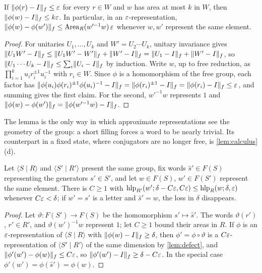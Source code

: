\begin{lemma}\label{lem:defect}
If $\lVert \phi(r)-I\rVert_f\le\varepsilon$ for every $r\in W$ and $w$ has area at most $k$ in $W$, then $\lVert \phi(w)-I\rVert_f\le k\varepsilon$. In particular, in an
$\varepsilon$-representation, $\lVert \phi(w)-\phi(w')\rVert_f\le\operatorname{Area}_R(w'^{-1}w)\,\varepsilon$ whenever $w,w'$ represent the same element.
\end{lemma}

\begin{proof}
For unitaries $U_1,\dots,U_k$ and $W'=U_2\cdots U_k$, unitary invariance gives $\lVert U_1W'-I\rVert_f\le\lVert U_1W'-W'\rVert_f+\lVert W'-I\rVert_f=\lVert U_1-I\rVert_f+\lVert W'-I\rVert_f$,
so $\lVert U_1\cdots U_k-I\rVert_f\le\sum_i\lVert U_i-I\rVert_f$ by induction. Write $w$, up to free reduction, as $\prod_{i=1}^ku_ir_i^{\pm1}u_i^{-1}$ with
$r_i\in W$. Since $\phi$ is a homomorphism of the free group, each factor has
$\lVert \phi(u_i)\phi(r_i)^{\pm1}\phi(u_i)^{-1}-I\rVert_f=\lVert \phi(r_i)^{\pm1}-I\rVert_f=\lVert \phi(r_i)-I\rVert_f\le\varepsilon$, and summing gives the first claim. For the
second, $w'^{-1}w$ represents $1$ and $\lVert \phi(w)-\phi(w')\rVert_f=\lVert \phi(w'^{-1}w)-I\rVert_f$.
\end{proof}

The lemma is the only way in which approximate representations see the geometry of the group: a short filling forces a word to be nearly
trivial. Its counterpart in a fixed state, where conjugators are no longer free, is \cref{lem:calculus}(d).

\begin{lemma}\label{lem:change-presentation}
Let $\langle S\mid R\rangle$ and $\langle S'\mid R'\rangle$ present the same group, fix words $\hat s'\in F(S)$ representing the generators
$s'\in S'$, and let $w\in F(S)$, $w'\in F(S')$ represent the same element. There is $C\ge1$ with
$\operatorname{hlp}_{R'}(w';\delta-C\varepsilon,C\varepsilon)\le\operatorname{hlp}_R(w;\delta,\varepsilon)$ whenever $C\varepsilon<\delta$; if $w'=s'$ is a letter and $\hat s'=w$, the loss in
$\delta$ disappears.
\end{lemma}

\begin{proof}
Let $\vartheta:F(S')\to F(S)$ be the homomorphism $s'\mapsto\hat s'$. The words $\vartheta(r')$, $r'\in R'$, and $\vartheta(w')^{-1}w$
represent $1$; let $C\ge1$ bound their areas in $R$. If $\phi$ is an $\varepsilon$-representation of $\langle S\mid R\rangle$ with
$\lVert \phi(w)-I\rVert_f\ge\delta$, then $\phi'=\phi\circ\vartheta$ is a $C\varepsilon$-representation of $\langle S'\mid R'\rangle$ of the same dimension
by \cref{lem:defect}, and $\lVert \phi'(w')-\phi(w)\rVert_f\le C\varepsilon$, so $\lVert \phi'(w')-I\rVert_f\ge\delta-C\varepsilon$. In the special case
$\phi'(w')=\phi(\hat s')=\phi(w)$.
\end{proof}

